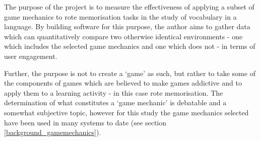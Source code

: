 The purpose of the project is to measure the effectiveness of applying a
subset of game mechanics to rote memorisation tasks in the study of vocabulary
in a language. By building software for this purpose, the author aims to gather
data which can quantitatively compare two otherwise identical environments 
- one which includes the selected game mechanics and one which does 
not - in terms of user engagement.

Further, the purpose is not to create a `game' as such, but rather to take some
of the components of games which are believed to make games addictive and to apply
them to a learning activity - in this case rote memorisation. The determination
of what constitutes a `game mechanic' is debatable and a
somewhat subjective topic, however for this study the game mechanics selected
have been used in many systems to date (see section \ref{background_gamemechanics}).
